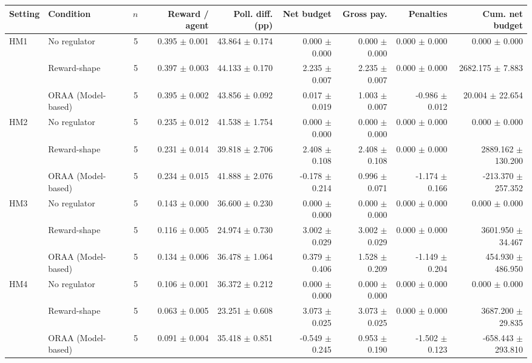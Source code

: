 \begin{tabular}{llrrrrrrr}
\toprule
Setting & Condition & $n$ & Reward / agent & Poll. diff. (pp) & Net budget & Gross pay. & Penalties & Cum. net budget \\
\midrule
HM1 & No regulator & 5 & 0.395 $\pm$ 0.001 & 43.864 $\pm$ 0.174 & 0.000 $\pm$ 0.000 & 0.000 $\pm$ 0.000 & 0.000 $\pm$ 0.000 & 0.000 $\pm$ 0.000 \\
 & Reward-shape & 5 & 0.397 $\pm$ 0.003 & 44.133 $\pm$ 0.170 & 2.235 $\pm$ 0.007 & 2.235 $\pm$ 0.007 & 0.000 $\pm$ 0.000 & 2682.175 $\pm$ 7.883 \\
 & ORAA (Model-based) & 5 & 0.395 $\pm$ 0.002 & 43.856 $\pm$ 0.092 & 0.017 $\pm$ 0.019 & 1.003 $\pm$ 0.007 & -0.986 $\pm$ 0.012 & 20.004 $\pm$ 22.654 \\
\addlinespace
HM2 & No regulator & 5 & 0.235 $\pm$ 0.012 & 41.538 $\pm$ 1.754 & 0.000 $\pm$ 0.000 & 0.000 $\pm$ 0.000 & 0.000 $\pm$ 0.000 & 0.000 $\pm$ 0.000 \\
 & Reward-shape & 5 & 0.231 $\pm$ 0.014 & 39.818 $\pm$ 2.706 & 2.408 $\pm$ 0.108 & 2.408 $\pm$ 0.108 & 0.000 $\pm$ 0.000 & 2889.162 $\pm$ 130.200 \\
 & ORAA (Model-based) & 5 & 0.234 $\pm$ 0.015 & 41.888 $\pm$ 2.076 & -0.178 $\pm$ 0.214 & 0.996 $\pm$ 0.071 & -1.174 $\pm$ 0.166 & -213.370 $\pm$ 257.352 \\
\addlinespace
HM3 & No regulator & 5 & 0.143 $\pm$ 0.000 & 36.600 $\pm$ 0.230 & 0.000 $\pm$ 0.000 & 0.000 $\pm$ 0.000 & 0.000 $\pm$ 0.000 & 0.000 $\pm$ 0.000 \\
 & Reward-shape & 5 & 0.116 $\pm$ 0.005 & 24.974 $\pm$ 0.730 & 3.002 $\pm$ 0.029 & 3.002 $\pm$ 0.029 & 0.000 $\pm$ 0.000 & 3601.950 $\pm$ 34.467 \\
 & ORAA (Model-based) & 5 & 0.134 $\pm$ 0.006 & 36.478 $\pm$ 1.064 & 0.379 $\pm$ 0.406 & 1.528 $\pm$ 0.209 & -1.149 $\pm$ 0.204 & 454.930 $\pm$ 486.950 \\
\addlinespace
HM4 & No regulator & 5 & 0.106 $\pm$ 0.001 & 36.372 $\pm$ 0.212 & 0.000 $\pm$ 0.000 & 0.000 $\pm$ 0.000 & 0.000 $\pm$ 0.000 & 0.000 $\pm$ 0.000 \\
 & Reward-shape & 5 & 0.063 $\pm$ 0.005 & 23.251 $\pm$ 0.608 & 3.073 $\pm$ 0.025 & 3.073 $\pm$ 0.025 & 0.000 $\pm$ 0.000 & 3687.200 $\pm$ 29.835 \\
 & ORAA (Model-based) & 5 & 0.091 $\pm$ 0.004 & 35.418 $\pm$ 0.851 & -0.549 $\pm$ 0.245 & 0.953 $\pm$ 0.190 & -1.502 $\pm$ 0.123 & -658.443 $\pm$ 293.810 \\

\end{tabular}
